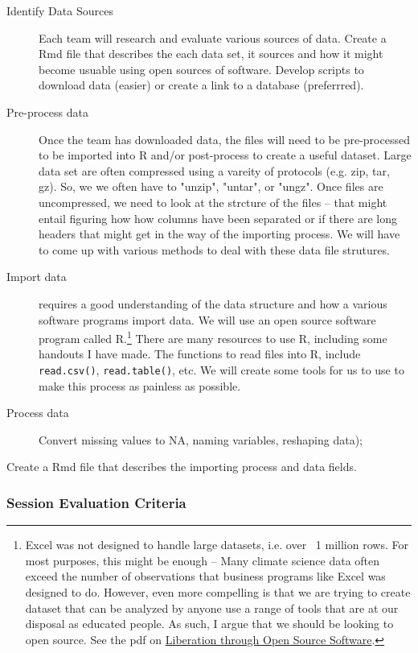 \documentclass{article}\usepackage[]{graphicx}\usepackage[]{color}
\begin{document}
\begin{description}
  \item[Identify Data Sources] Each team will research and evaluate various sources of data. Create a Rmd file that describes the each data set, it sources and how it might become usuable using open sources of software. Develop scripts to download data (easier) or create a link to a database (preferrred). 
  \item[Pre-process data] Once the team has downloaded data, the files will need to be pre-processed to be imported into R and/or post-process to create a useful dataset. Large data set are often compressed using a vareity of protocols (e.g. zip, tar, gz). So, we we often have to "unzip", "untar", or "ungz". Once files are uncompressed, we need to look at the strcture of the files -- that might entail figuring how how columns have been separated or if there are long headers that might get in the way of the importing process. We will have to come up with various methods to deal with these data file strutures. 
  \item[Import data] requires a good understanding of the data structure and how a various software programs import data. We will use an open source software program called R.\footnote{Excel was not designed to handle large datasets, i.e. over ~1 million rows. For most purposes, this might be enough -- Many climate science data often exceed the number of observations that business programs like Excel was designed to do. However, even more compelling is that we are trying to create dataset that can be analyzed by anyone use a range of tools that are at our disposal as educated people. As such, I argue that we should be looking to open source. See the pdf on \href{https://rstudio.campus.pomona.edu/s/c2d027b9f6ba35ba4d250/files/github/Climate_Change_Narratives/Data/Liberation_via_Open_Source_Software.pdf}{Liberation through Open Source Software}.
} There are many resources to use R, including some handouts I have made. The functions to read files into R, include \texttt{read.csv()}, \texttt{read.table()}, etc. We will create some tools for us to use to make this process as painless as possible. 
  \item[Process data] Convert missing values to NA, naming variables, reshaping data);
\end{description}

Create a Rmd file that describes the importing process and data fields.

\subsubsection{Session Evaluation Criteria}
\end{document}
